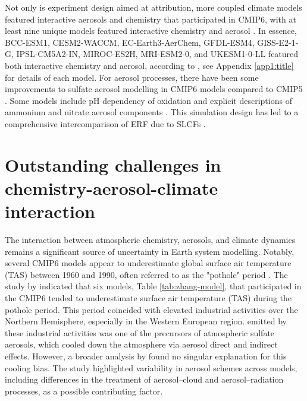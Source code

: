 Not only is experiment design aimed at attribution, more coupled climate models featured interactive aerosols and chemistry that participated in CMIP6, with at least nine unique models featured interactive chemistry and aerosol \citep[e.g.,][]{zhangBCCESM1ModelDatasets2021, vannoijeECEarth3AerChemGlobalClimate2021, mulcahyDescriptionEvaluationAerosol2020}. In essence, BCC-ESM1, CESM2-WACCM, EC-Earth3-AerChem, GFDL-ESM4, GISS-E2-1-G, IPSL-CM5A2-IN, MIROC-ES2H, MRI-ESM2-0, and UKESM1-0-LL featured both interactive chemistry and aerosol, according to \citet{ipccAnnexIIModels2023}, see Appendix \ref{app1:title} for details of each model. For aerosol processes, there have been some improvements to sulfate aerosol modelling in CMIP6 models compared to CMIP5 \citep{forsterEarthEnergyBudget2021}. Some models include pH dependency of  oxidation \citep[such as the NorESM1; ][]{kirkevagProductiontaggedAerosolModule2018} and explicit descriptions of ammonium and nitrate aerosol components \citep{bianInvestigationGlobalParticulate2017}. This simulation design has led to a comprehensive intercomparison of ERF due to SLCFs \citep[e.g., ][]{thornhillEffectiveRadiativeForcing2021,griffithsTroposphericOzoneCMIP62021,thornhillClimatedrivenChemistryAerosol2021,wangCompensationCloudFeedback2021,stevensonTrendsGlobalTropospheric2020,smithEffectiveRadiativeForcing2020}.

\section{Outstanding challenges in chemistry-aerosol-climate interaction}

The interaction between atmospheric chemistry, aerosols, and climate dynamics remains a significant source of uncertainty in Earth system modelling. Notably, several CMIP6 models appear to underestimate global surface air temperature (TAS) between 1960 and 1990, often referred to as the "pothole" period \citep{zhangRoleAnthropogenicAerosols2021, flynnStrongAerosolCooling2023}.  The study by \citet{zhangRoleAnthropogenicAerosols2021} indicated that six models, Table \ref{tab:zhang-model}, that participated in the CMIP6 tended to underestimate surface air temperature (TAS) during the pothole period. This period coincided with elevated industrial activities over the Northern Hemisphere, especially in the Western European region.  emitted by these industrial activities was one of the precursors of atmospheric sulfate aerosols, which cooled down the atmosphere via aerosol direct and indirect effects. However, a broader analysis by \citet{flynnStrongAerosolCooling2023} found no singular explanation for this cooling bias. The study highlighted variability in aerosol schemes across models, including differences in the treatment of aerosol–cloud and aerosol–radiation processes, as a possible contributing factor. 

